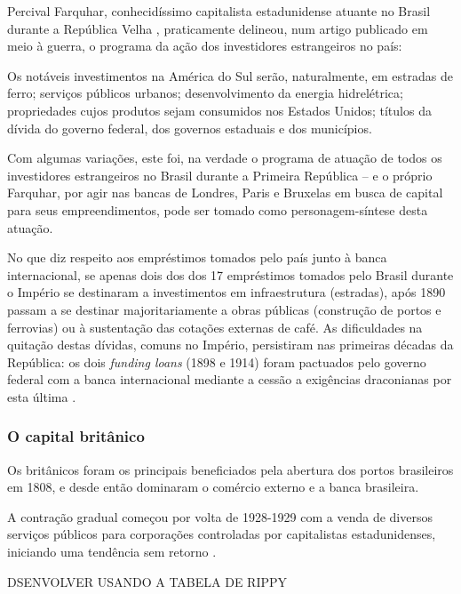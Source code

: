 Percival Farquhar, conhecidíssimo capitalista estadunidense atuante no Brasil durante a República Velha \cite{CUNHA2011}, praticamente delineou, num artigo publicado em meio à guerra, o programa da ação dos investidores estrangeiros no país:

\begin{citacao}
Os notáveis investimentos na América do Sul serão, naturalmente, em estradas de ferro; serviços públicos urbanos; desenvolvimento da energia hidrelétrica; propriedades cujos produtos sejam consumidos nos Estados Unidos; títulos da dívida do governo federal, dos governos estaduais e dos municípios. \cite[p.~398]{farquhar_invest_1916}
\end{citacao}

Com algumas variações, este foi, na verdade o programa de atuação de todos os investidores estrangeiros no Brasil durante a Primeira República -- e o próprio Farquhar, por agir nas bancas de Londres, Paris e Bruxelas em busca de capital para seus empreendimentos, pode ser tomado como personagem-síntese desta atuação.

No que diz respeito aos empréstimos tomados pelo país junto à banca internacional, se apenas dois dos dos 17 empréstimos tomados pelo Brasil durante o Império se destinaram a investimentos em infraestrutura (estradas), após 1890 passam a se destinar majoritariamente a obras públicas (construção de portos e ferrovias) ou à sustentação das cotações externas de café. As dificuldades na quitação destas dívidas, comuns no Império, persistiram nas primeiras décadas da República: os dois \textit{funding loans} (1898 e 1914) foram pactuados pelo governo federal com a banca internacional mediante a cessão a exigências draconianas por esta última \cite[p.~365]{singer_braecomu_1977}.

\subsubsection{O capital britânico}\label{subsubsec:capbrit}

Os britânicos foram os principais beneficiados pela abertura dos portos brasileiros em 1808, e desde então dominaram o comércio externo e a banca brasileira.

A contração gradual começou por volta de 1928-1929 com a venda de diversos serviços públicos para corporações controladas por capitalistas estadunidenses, iniciando uma tendência sem retorno \cite{rippy_britlat_1954}.

DSENVOLVER USANDO A TABELA DE RIPPY

